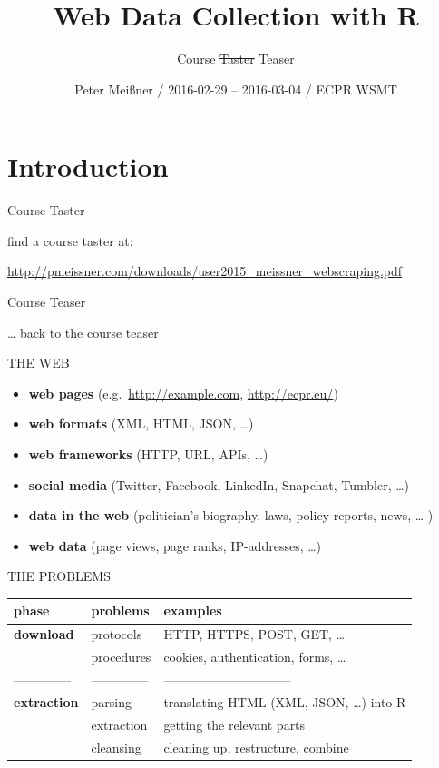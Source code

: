 \documentclass[ignorenonframetext,]{beamer}
\title{Web Data Collection with R}
\subtitle{Course \sout{Taster} Teaser}
\author{Peter Meißner / 2016-02-29 -- 2016-03-04 / ECPR WSMT}
\date{}
\providecommand{\tightlist}{%
  \setlength{\itemsep}{0pt}\setlength{\parskip}{0pt}}
\begin{document}
\frame{\titlepage}

\begin{frame}
\tableofcontents[hideallsubsections]
\end{frame}

\section{Introduction}\label{introduction}

\begin{frame}{Course Taster}

find a course taster at:

\url{http://pmeissner.com/downloads/user2015_meissner_webscraping.pdf}

\end{frame}

\begin{frame}{Course Teaser}

\ldots{} back to the course teaser

\end{frame}

\begin{frame}{THE WEB}

\begin{itemize}
\tightlist
\item
  \textbf{web pages} (e.g.~\url{http://example.com},
  \url{http://ecpr.eu/})
\item
  \textbf{web formats} (XML, HTML, JSON, \ldots{})
\item
  \textbf{web frameworks} (HTTP, URL, APIs, \ldots{})
\item
  \textbf{social media} (Twitter, Facebook, LinkedIn, Snapchat, Tumbler,
  \ldots{})
\item
  \textbf{data in the web} (politician's biography, laws, policy
  reports, news, \ldots{} )
\item
  \textbf{web data} (page views, page ranks, IP-addresses, \ldots{})
\end{itemize}

\end{frame}

\begin{frame}{THE PROBLEMS}

\begin{longtable}[c]{@{}lll@{}}
\toprule
\textbf{phase} & \textbf{problems} & \textbf{examples}\tabularnewline
\midrule
\endhead
\textbf{download} & protocols & HTTP, HTTPS, POST, GET,
\ldots{}\tabularnewline
~ & procedures & cookies, authentication, forms, \ldots{}\tabularnewline
-------------- & -------------- &
------------------------------\tabularnewline
\textbf{extraction} & parsing & translating HTML (XML, JSON, \ldots{})
into R\tabularnewline
~ & extraction & getting the relevant parts\tabularnewline
~ & cleansing & cleaning up, restructure, combine\tabularnewline
\bottomrule
\end{longtable}

\end{frame}
\end{document}
